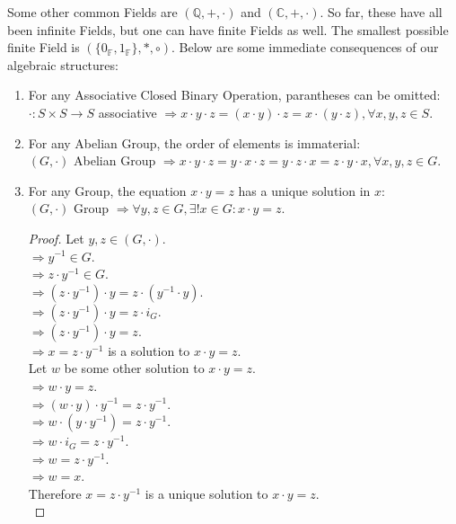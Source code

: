 \documentclass{article}
\begin{document}
			Some other common Fields are $(\mathbb{Q}, +, \cdot)$ and $(\mathbb{C}, +, \cdot)$. 
			So far, these have all been infinite Fields, but one can have finite Fields as well.
			The smallest possible finite Field is $(\{0_\mathbb{F}, 1_\mathbb{F} \}, *, \circ)$. Below are some immediate consequences of our algebraic structures:
			\begin{enumerate}
				\item For any Associative Closed Binary Operation, parantheses can be omitted:
				$\cdot \colon S \times S \to S$ associative $\Rightarrow x \cdot y \cdot z = (x \cdot y) \cdot z = x \cdot (y \cdot z), \forall x, y, z \in S$.
				
				\item For any Abelian Group, the order of elements is immaterial: \\
				$(G, \cdot)$  Abelian Group $\Rightarrow x \cdot y \cdot z = y \cdot x \cdot z = y \cdot z \cdot x = z \cdot y \cdot x, \forall x, y, z \in G$.
				
				\item For any Group, the equation $x \cdot y = z$ has a unique solution in $x$: \\
				$(G, \cdot)$ Group $\Rightarrow \forall y, z \in G, \exists! x \in G: x \cdot y = z$.
				\begin{proof}
					Let $y, z \in (G, \cdot)$.\\
					$\Rightarrow y^{-1} \in G$.\\
					$\Rightarrow z \cdot y^{-1} \in G$.\\
					$\Rightarrow (z \cdot y^{-1}) \cdot y = z \cdot (y^{-1} \cdot y)$.\\
					$\Rightarrow (z \cdot y^{-1}) \cdot y = z \cdot i_G$.\\
					$\Rightarrow (z \cdot y^{-1}) \cdot y = z$.\\
					$\Rightarrow x = z \cdot y^{-1}$ is a solution to $x \cdot y = z$.\\
					Let $w$ be some other solution to $x \cdot y = z$.\\
					$\Rightarrow w \cdot y = z$.\\
					$\Rightarrow (w \cdot y) \cdot y^{-1} = z \cdot y^{-1}$.\\
					$\Rightarrow w \cdot (y \cdot y^{-1}) = z \cdot y^{-1}$.\\
					$\Rightarrow w \cdot i_G = z \cdot y^{-1}$.\\
					$\Rightarrow w = z \cdot y^{-1}$.\\
					$\Rightarrow w = x$.\\
					Therefore $ x = z \cdot y^{-1}$ is a unique solution to $x \cdot y = z$.\\		
				\end{proof}


\end{enumerate}
\end{document}
